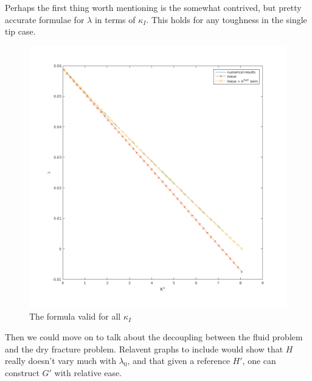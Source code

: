 \documentclass{jfm}
\begin{document}
Perhaps the first thing worth mentioning is the somewhat contrived, but pretty
accurate formulae for $\lambda$ in terms of $\kappa_I$. This holds for any 
toughness in the single tip case.
\begin{figure}
 \centerline{
\includegraphics[scale=0.3]{./../../Graphs/full-relation.png}}
  \caption{The formula valid for all $\kappa_I$}
\end{figure}

Then we could move on to talk about the decoupling between the fluid problem
and the dry fracture problem. Relavent graphs to include would show that
$H$ really doesn't vary much with $\lambda_0$, and that given a reference
$H'$, one can construct $G'$ with relative ease.
\end{document}
